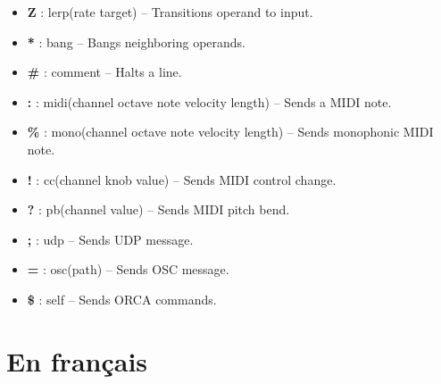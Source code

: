 \documentclass[a4paper]{report}
\begin{document}
\begin{itemize}
  \item \textbf{Z} : lerp(rate target) -- Transitions operand to input.
  \item \textbf{*} : bang -- Bangs neighboring operands.
  \item \textbf{\#} : comment -- Halts a line.
  \item \textbf{:} : midi(channel octave note velocity length) -- Sends a MIDI note.
  \item \textbf{\%} : mono(channel octave note velocity length) -- Sends monophonic MIDI note.
  \item \textbf{!} : cc(channel knob value) -- Sends MIDI control change.
  \item \textbf{?} : pb(channel value) -- Sends MIDI pitch bend.
  \item \textbf{;} : udp -- Sends UDP message.
  \item \textbf{=} : osc(path) -- Sends OSC message.
  \item \textbf{\$} : self -- Sends ORCA commands.
\end{itemize}

\newpage
\section*{En français}
\end{document}
